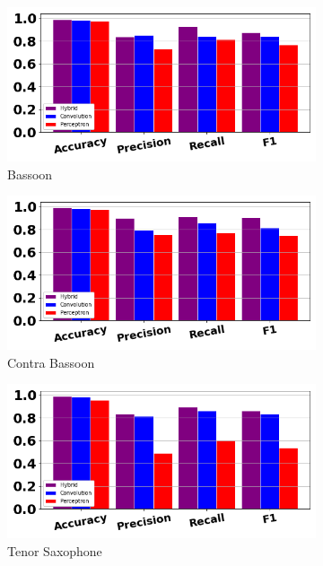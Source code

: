 \documentclass[12pt,letterpaper]{article}
\begin{document}
\begin{figure}[H]
	\begin{subfigure}[b]{0.45\textwidth}
	\centering
	\includegraphics[width=\textwidth]{../FiguresClasses/Bassoon}
	\caption{Bassoon}
	\end{subfigure}	
	\hfill
	\begin{subfigure}[b]{0.45\textwidth}
	\centering
	\includegraphics[width=\textwidth]{../FiguresClasses/ContraBassoon}
	\caption{Contra Bassoon}
	\end{subfigure}	
	
	\begin{subfigure}[b]{0.45\textwidth}
	\centering
	\includegraphics[width=\textwidth]{../FiguresClasses/Saxophone}
	\caption{Tenor Saxophone}
	\end{subfigure}
	
\caption{}
\label{fig-LowWindsScores}
\end{figure}
\end{document}
